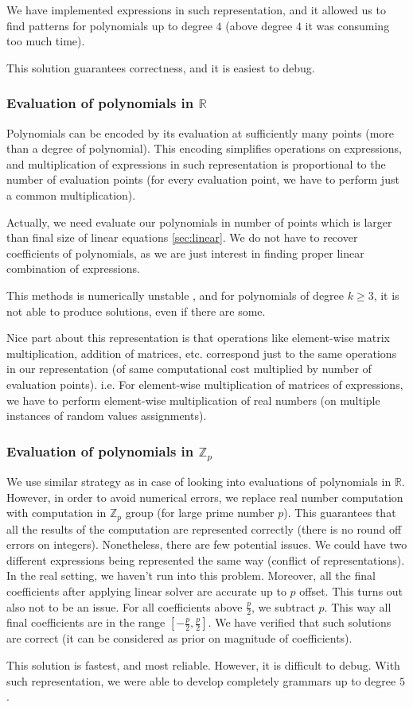 We have implemented expressions in such representation, and it allowed us
to find patterns for polynomials up to degree $4$ (above degree $4$ it was consuming too much time).

This solution guarantees correctness, and it is easiest to debug.


\subsubsection{Evaluation of polynomials in $\mathbb{R}$}
Polynomials can be encoded 
by its evaluation at sufficiently many points (more than a degree of polynomial).
This encoding simplifies operations on expressions, and multiplication of expressions
in such representation is proportional to the number of evaluation points (for every evaluation
point, we have to perform just a common multiplication).

Actually, we need evaluate our polynomials in number of points which is larger 
than final size of linear equations \ref{sec:linear}. We do not have to recover coefficients of polynomials,
as we are just interest in finding proper linear combination of expressions.


This methods is numerically unstable
, and for polynomials of degree $k \geq 3$, it is not able to produce solutions, even if there are some.

Nice part about this representation is that operations like element-wise matrix multiplication, addition of matrices, etc.
correspond just to the same operations in our representation (of same computational cost multiplied by number of evaluation points). i.e. 
For element-wise multiplication of matrices of expressions, we
have to perform element-wise multiplication of real numbers (on multiple instances of random values assignments).


\subsubsection{Evaluation of polynomials in $\mathbb{Z}_p$}
We use similar strategy as in case of looking into evaluations of polynomials in $\mathbb{R}$. However, in order
to avoid numerical errors, we replace real number computation with computation in $\mathbb{Z}_p$ group (for large prime number $p$). This
guarantees that all the results of the computation are represented correctly (there is no round off errors on integers). Nonetheless, there are few potential
issues. We could have two different expressions being represented the same way (conflict of representations). In the
real setting, we haven't run into this problem. Moreover, all the final coefficients after applying linear solver are
accurate up to $p$ offset. This turns out also not to be an issue. For all coefficients above $\frac{p}{2}$, we subtract $p$. 
This way all final coefficients are in the range $[-\frac{p}{2}, \frac{p}{2}]$. We have verified that such solutions are correct
(it can be considered as prior on magnitude of coefficients). 

This solution is fastest, and most reliable. However, it is difficult to debug. With such representation, we were able to
develop completely grammars up to degree $5$.

